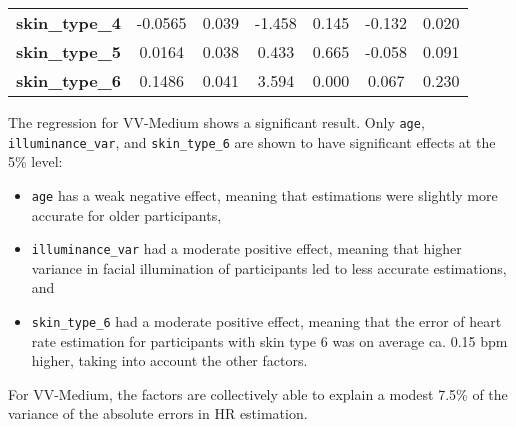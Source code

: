 \documentclass{article}
\begin{document}
\begin{table}[h!]
\begin{center}
\begin{tabular}{lcccccc}
\textbf{skin\_type\_4}  			 &      -0.0565  &        0.039     &    -1.458  &         0.145        &       -0.132    &        0.020     \\
\textbf{skin\_type\_5}  			 &       0.0164  &        0.038     &     0.433  &         0.665        &       -0.058    &        0.091     \\
\textbf{skin\_type\_6}  			 &       0.1486  &        0.041     &     3.594  &         0.000        &        0.067    &        0.230     \\
\bottomrule
\end{tabular}
\end{center}
\end{table}

The regression for VV-Medium shows a significant result.
Only \texttt{age}, \texttt{illuminance\_var}, and \texttt{skin\_type\_6} are shown to have significant effects at the 5\% level:

\begin{itemize}
	\item \texttt{age} has a weak negative effect, meaning that estimations were slightly more accurate for older participants,
	\item \texttt{illuminance\_var} had a moderate positive effect, meaning that higher variance in facial illumination of participants led to less accurate estimations, and
	\item \texttt{skin\_type\_6} had a moderate positive effect, meaning that the error of heart rate estimation for participants with skin type 6 was on average ca. 0.15 bpm higher, taking into account the other factors.
\end{itemize}

For VV-Medium, the factors are collectively able to explain a modest 7.5\% of the variance of the absolute errors in HR estimation.
\end{document}
